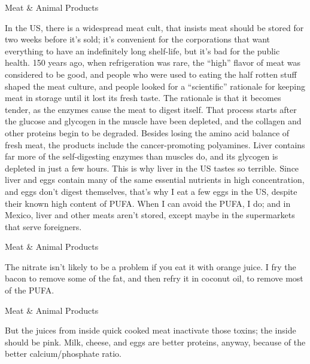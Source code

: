 \documentclass[11pt,oneside,openany,extrafontsizes]{memoir}
\begin{document}
\begin{standalonequote}{Meat \& Animal Products}

    \begin{answer}
        In the US, there is a widespread meat cult, that insists meat should be stored for two weeks before it's sold; it's convenient for the corporations that want everything to have an indefinitely long shelf-life, but it's bad for the public health. 150 years ago, when refrigeration was rare, the \enquote{high} flavor of meat was considered to be good, and people who were used to eating the half rotten stuff shaped the meat culture, and people looked for a \enquote{scientific} rationale for keeping meat in storage until it lost its fresh taste. The rationale is that it becomes tender, as the enzymes cause the meat to digest itself. That process starts after the glucose and glycogen in the muscle have been depleted, and the collagen and other proteins begin to be degraded. Besides losing the amino acid balance of fresh meat, the products include the cancer-promoting polyamines. Liver contains far more of the self-digesting enzymes than muscles do, and its glycogen is depleted in just a few hours. This is why liver in the US tastes so terrible. Since liver and eggs contain many of the same essential nutrients in high concentration, and eggs don't digest themselves, that's why I eat a few eggs in the US, despite their known high content of PUFA. When I can avoid the PUFA, I do; and in Mexico, liver and other meats aren't stored, except maybe in the supermarkets that serve foreigners.
    \end{answer}
\end{standalonequote}

\begin{standalonequote}{Meat \& Animal Products}

    \begin{answer}
        The nitrate isn't likely to be a problem if you eat it with orange juice. I fry the bacon to remove some of the fat, and then refry it in coconut oil, to remove most of the PUFA.
    \end{answer}
\end{standalonequote}

\begin{standalonequote}{Meat \& Animal Products}

    \begin{answer}
        But the juices from inside quick cooked meat inactivate those toxins; the inside should be pink. Milk, cheese, and eggs are better proteins, anyway, because of the better calcium/phosphate ratio.
    \end{answer}
\end{standalonequote}
\end{document}
